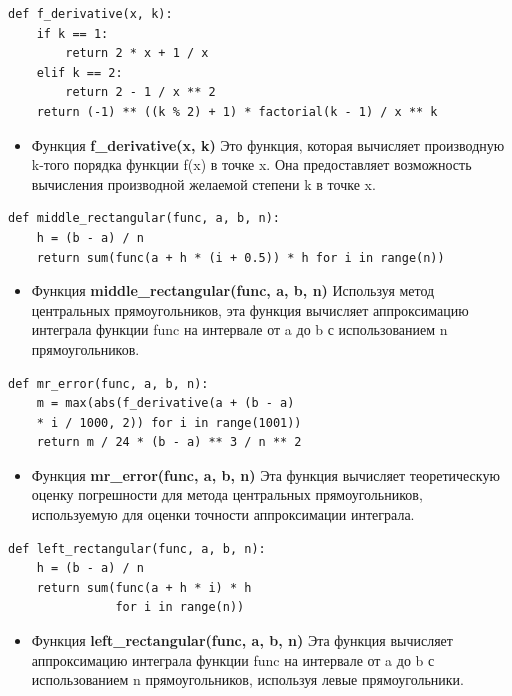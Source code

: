 \documentclass{article}
\begin{document}
\begin{lstlisting}
def f_derivative(x, k):
    if k == 1:
        return 2 * x + 1 / x
    elif k == 2:
        return 2 - 1 / x ** 2
    return (-1) ** ((k % 2) + 1) * factorial(k - 1) / x ** k
\end{lstlisting}

\begin{itemize}
\item Функция \textbf{ f\_derivative(x, k)} Это функция, которая вычисляет производную k-того порядка функции f(x) в точке x. Она предоставляет возможность вычисления производной желаемой степени k в точке x.
\end{itemize}

\begin{lstlisting}
def middle_rectangular(func, a, b, n):
    h = (b - a) / n
    return sum(func(a + h * (i + 0.5)) * h for i in range(n))
\end{lstlisting}

\begin{itemize}
\item Функция \textbf{middle\_rectangular(func, a, b, n)} Используя метод центральных прямоугольников, эта функция вычисляет аппроксимацию интеграла функции func на интервале от a до b с использованием n прямоугольников.
\end{itemize}



\begin{lstlisting}
def mr_error(func, a, b, n):
    m = max(abs(f_derivative(a + (b - a) 
    * i / 1000, 2)) for i in range(1001))
    return m / 24 * (b - a) ** 3 / n ** 2
\end{lstlisting}


\begin{itemize}
\item Функция \textbf{mr\_error(func, a, b, n)} Эта функция вычисляет теоретическую оценку погрешности для метода центральных прямоугольников, используемую для оценки точности аппроксимации интеграла.
\end{itemize}


\begin{lstlisting}
def left_rectangular(func, a, b, n):
    h = (b - a) / n
    return sum(func(a + h * i) * h
               for i in range(n))
\end{lstlisting}

\begin{itemize}
\item Функция \textbf{left\_rectangular(func, a, b, n)} Эта функция вычисляет аппроксимацию интеграла функции func на интервале от a до b с использованием n прямоугольников, используя левые прямоугольники.
\end{itemize}
\end{document}
